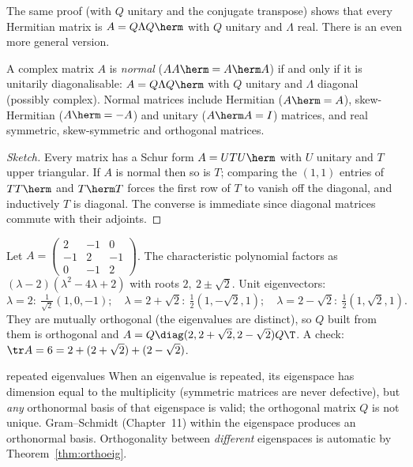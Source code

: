 The same proof (with $Q$ unitary and the conjugate transpose) shows that every Hermitian matrix is $A=Q\Lambda Q\herm$ with $Q$ unitary and $\Lambda$ real. There is an even more general version.

\begin{theorem}\label{thm:spectralnormal}
A complex matrix $A$ is \emph{normal} ($AA\herm=A\herm A$) if and only if it is unitarily diagonalisable: $A=Q\Lambda Q\herm$ with $Q$ unitary and $\Lambda$ diagonal (possibly complex). Normal matrices include Hermitian ($A\herm=A$), skew-Hermitian ($A\herm=-A$) and unitary ($A\herm A=I$) matrices, and real symmetric, skew-symmetric and orthogonal matrices.
\end{theorem}

\begin{proof}[Sketch]
Every matrix has a Schur form $A=UTU\herm$ with $U$ unitary and $T$ upper triangular. If $A$ is normal then so is $T$; comparing the $(1,1)$ entries of $TT\herm$ and $T\herm T$ forces the first row of $T$ to vanish off the diagonal, and inductively $T$ is diagonal. The converse is immediate since diagonal matrices commute with their adjoints.
\end{proof}

\begin{example}\label{ex:spectral}
Let $A=\begin{pmatrix}2&-1&0\\-1&2&-1\\0&-1&2\end{pmatrix}$. The characteristic polynomial factors as $(\lambda-2)(\lambda^2-4\lambda+2)$ with roots $2,\ 2\pm\sqrt2$. Unit eigenvectors:
\[ \lambda=2:\ \tfrac1{\sqrt2}(1,0,-1);\quad\lambda=2+\sqrt2:\ \tfrac12(1,-\sqrt2,1);\quad\lambda=2-\sqrt2:\ \tfrac12(1,\sqrt2,1). \]
They are mutually orthogonal (the eigenvalues are distinct), so $Q$ built from them is orthogonal and $A=Q\diag(2,2+\sqrt2,2-\sqrt2)Q\T$. A check: $\tr A=6=2+(2+\sqrt2)+(2-\sqrt2)$.
\end{example}

\begin{nuance}{repeated eigenvalues}
When an eigenvalue is repeated, its eigenspace has dimension equal to the multiplicity (symmetric matrices are never defective), but \emph{any} orthonormal basis of that eigenspace is valid; the orthogonal matrix $Q$ is not unique. Gram--Schmidt (Chapter~11) within the eigenspace produces an orthonormal basis. Orthogonality between \emph{different} eigenspaces is automatic by Theorem~\ref{thm:orthoeig}.
\end{nuance}

